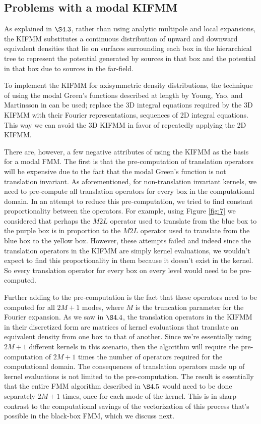 \documentclass[11pt, oneside]{article}   	%
\begin{document}
\subsection{Problems with a modal KIFMM}
As explained in $\S4.3$, rather than using analytic multipole and local expansions, the KIFMM substitutes a continuous distribution of upward and downward equivalent densities that lie on surfaces surrounding each box in the hierarchical tree to represent the potential generated by sources in that box and the potential in that box due to sources in the far-field.

To implement the KIFMM for axisymmetric density distributions, the technique of using the modal Green's functions described at length by Young, Yao, and Martinsson in \cite{YYM} can be used; replace the 3D integral equations required by the 3D KIFMM with their Fourier representations, sequences of 2D integral equations. This way we can avoid the 3D KIFMM in favor of repeatedly applying the 2D KIFMM.

There are, however, a few negative attributes of using the KIFMM as the basis for a modal FMM. The first is that the pre-computation of translation operators will be expensive due to the fact that the modal Green's function is not translation invariant. As aforementioned, for non-translation invariant kernels, we need to pre-compute all translation operators for every box in the computational domain. In an attempt to reduce this pre-computation, we tried to find constant proportionality between the operators. For example, using Figure \ref{fig:7} we considered that perhaps the $M2L$ operator used to translate from the blue box to the purple box is in proportion to the $M2L$ operator used to translate from the blue box to the yellow box. However, these attempts failed and indeed since the translation operators in the KIFMM are simply kernel evaluations, we wouldn't expect to find this proportionality in them because it doesn't exist in the kernel. So every translation operator for every box on every level would need to be pre-computed.

Further adding to the pre-computation is the fact that these operators need to be computed for all $2M+1$ modes, where $M$ is the truncation parameter for the Fourier expansion. As we saw in $\S4.4$, the translation operators in the KIFMM in their discretized form are matrices of kernel evaluations that translate an equivalent density from one box to that of another. Since we're essentially using $2M+1$ different kernels in this scenario, then the algorithm will require the pre-computation of $2M+1$ times the number of operators required for the computational domain. The consequences of translation operators made up of kernel evaluations is not limited to the pre-computation. The result is essentially that the entire FMM algorithm described in $\S4.5$ would need to be done separately $2M+1$ times, once for each mode of the kernel. This is in sharp contrast to the computational savings of the vectorization of this process that's possible in the black-box FMM, which we discuss next.
\end{document}
